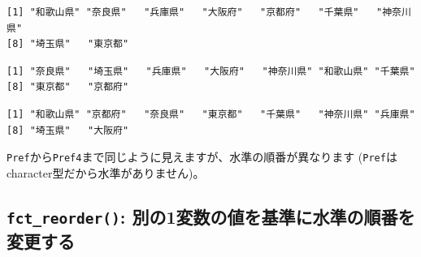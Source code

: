 \documentclass[
  a4paper,
  pandoc,
  ja=standard,
  jafont=haranoaji]{bxjsbook}
\newenvironment{Shaded}{\begin{snugshade}}{\end{snugshade}}
\newcommand{\FunctionTok}[1]{\textcolor[rgb]{0.28,0.35,0.67}{#1}}
\newcommand{\NormalTok}[1]{\textcolor[rgb]{0.00,0.48,0.65}{#1}}
\newcommand{\SpecialCharTok}[1]{\textcolor[rgb]{0.37,0.37,0.37}{#1}}
\begin{document}
\begin{Shaded}
\end{Shaded}

\begin{verbatim}
[1] "和歌山県" "奈良県"   "兵庫県"   "大阪府"   "京都府"   "千葉県"   "神奈川県"
[8] "埼玉県"   "東京都"  
\end{verbatim}

\begin{Shaded}
\end{Shaded}

\begin{verbatim}
[1] "奈良県"   "埼玉県"   "兵庫県"   "大阪府"   "神奈川県" "和歌山県" "千葉県"  
[8] "東京都"   "京都府"  
\end{verbatim}

\begin{Shaded}
\end{Shaded}

\begin{verbatim}
[1] "和歌山県" "京都府"   "奈良県"   "東京都"   "千葉県"   "神奈川県" "兵庫県"  
[8] "埼玉県"   "大阪府"  
\end{verbatim}

\texttt{Pref}から\texttt{Pref4}まで同じように見えますが、水準の順番が異なります
(\texttt{Pref}はcharacter型だから水準がありません)。

\hypertarget{fct_reorder-ux5225ux306e1ux5909ux6570ux306eux5024ux3092ux57faux6e96ux306bux6c34ux6e96ux306eux9806ux756aux3092ux5909ux66f4ux3059ux308b}{%
\subsection{\texorpdfstring{\texttt{fct\_reorder()}:
別の1変数の値を基準に水準の順番を変更する}{fct\_reorder(): 別の1変数の値を基準に水準の順番を変更する}}\label{fct_reorder-ux5225ux306e1ux5909ux6570ux306eux5024ux3092ux57faux6e96ux306bux6c34ux6e96ux306eux9806ux756aux3092ux5909ux66f4ux3059ux308b}}
\end{document}
